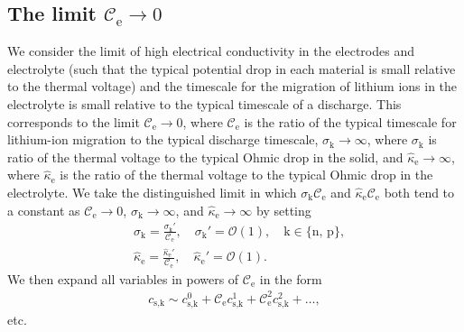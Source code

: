 \documentclass[a4paper]{article}
\newcommand{\ts}[1]{_{\text{#1}}}
\newcommand{\kin}[1]{\text{k} \in \{\text{#1}\}}
\begin{document}
\subsection{The limit $\mathcal{C}\ts{e} \rightarrow0$}\label{sec:asymptotic-reduction}
We consider the limit of high electrical conductivity in the electrodes and electrolyte (such that the typical potential drop in each material is small relative to the thermal voltage) and the timescale for the migration of lithium ions in the electrolyte is small relative to the typical timescale of a discharge. This corresponds to the limit $\mathcal{C}\ts{e}\rightarrow0$, where $\mathcal{C}\ts{e}$ is the ratio of the typical timescale for lithium-ion migration to the typical discharge timescale, $\sigma\ts{k}\rightarrow\infty$, where $\sigma\ts{k}$ is ratio of the thermal voltage to the typical Ohmic drop in the solid, and $\hat{\kappa}\ts{e}\rightarrow\infty$, where $\hat{\kappa}\ts{e}$ is the ratio of the thermal voltage to the typical Ohmic drop in the electrolyte. We take the distinguished limit in which $\sigma\ts{k}\mathcal{C}\ts{e}$ and $\hat{\kappa}\ts{e}\mathcal{C}\ts{e}$ both tend to a constant as $\mathcal{C}\ts{e}\rightarrow 0$, $\sigma\ts{k}\rightarrow\infty$, and $\hat{\kappa}\ts{e}\rightarrow\infty$ by setting 
    \begin{align*}
    &\sigma\ts{k} = \frac{\sigma\ts{k}'}{\mathcal{C}\ts{e}}, \quad \sigma\ts{k}' = \mathcal{O}(1), \quad \kin{n, p}, \\ 
    &\hat{\kappa}\ts{e} = \frac{\hat{\kappa}\ts{e}'}{\mathcal{C}\ts{e}}, \quad \hat{\kappa}\ts{e}' = \mathcal{O}(1).
    \end{align*}
We then expand all variables in powers of $\mathcal{C}\ts{e}$ in the form
\begin{align*} 
  c\ts{s,k} \sim c\ts{s,k}^0 + \mathcal{C}\ts{e} c\ts{s,k}^1 + \mathcal{C}\ts{e}^2 c\ts{s,k}^2 + \dots ,
\end{align*}
etc.
\end{document}
